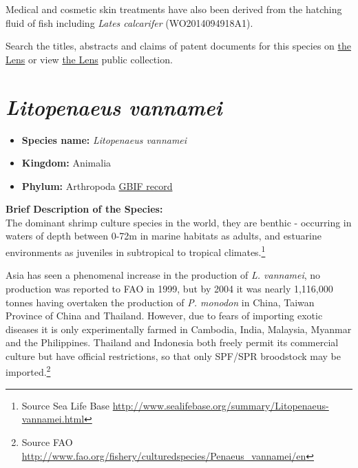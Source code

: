 \documentclass[openany]{book}
\providecommand{\tightlist}{%
  \setlength{\itemsep}{0pt}\setlength{\parskip}{0pt}}
\let\rmarkdownfootnote\footnote%
\def\footnote{\protect\rmarkdownfootnote}
\theoremstyle{definition}
\theoremstyle{definition}
\theoremstyle{definition}
\theoremstyle{remark}
\begin{document}
Medical and cosmetic skin treatments have also been derived from the
hatching fluid of fish including \emph{Lates calcarifer}
(WO2014094918A1).

Search the titles, abstracts and claims of patent documents for this
species on
\href{https://www.lens.org/lens/search?q=title:(\%22Clarias\%20macrocephalus\%22)\%20OR\%20abstract:(\%22Clarias\%20macrocephalus\%22)\%20OR\%20claims:(\%22Clarias\%20macrocephalus\%22)\&l=en\&preview=true}{the
Lens} or view \href{https://www.lens.org/lens/collection/167814}{the
Lens} public collection.

\hypertarget{litopenaeus-vannamei}{%
\section{\texorpdfstring{\emph{Litopenaeus
vannamei}}{Litopenaeus vannamei}}\label{litopenaeus-vannamei}}

\begin{itemize}
\tightlist
\item
  \textbf{Species name:} \emph{Litopenaeus vannamei}
\item
  \textbf{Kingdom:} Animalia
\item
  \textbf{Phylum:} Arthropoda
  \href{https://www.gbif.org/species/2223871}{GBIF record}
\end{itemize}

\textbf{Brief Description of the Species:}\\
The dominant shrimp culture species in the world, they are benthic -
occurring in waters of depth between 0-72m in marine habitats as adults,
and estuarine environments as juveniles in subtropical to tropical
climates.\footnote{Source Sea Life Base
  \url{http://www.sealifebase.org/summary/Litopenaeus-vannamei.html}}

Asia has seen a phenomenal increase in the production of \emph{L.
vannamei}, no production was reported to FAO in 1999, but by 2004 it was
nearly 1,116,000 tonnes having overtaken the production of \emph{P.
monodon} in China, Taiwan Province of China and Thailand. However, due
to fears of importing exotic diseases it is only experimentally farmed
in Cambodia, India, Malaysia, Myanmar and the Philippines. Thailand and
Indonesia both freely permit its commercial culture but have official
restrictions, so that only SPF/SPR broodstock may be imported.\footnote{Source
  FAO
  \url{http://www.fao.org/fishery/culturedspecies/Penaeus_vannamei/en}}
\end{document}
